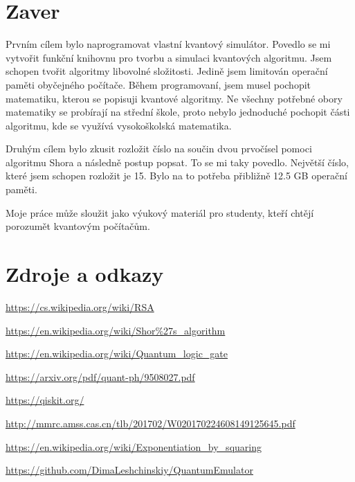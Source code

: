 \documentclass[11pt]{article}
\begin{document}
\newpage

\section{Zaver}
Prvním cílem bylo naprogramovat vlastní kvantový simulátor. Povedlo se mi vytvořit funkční knihovnu pro tvorbu a simulaci kvantových algoritmu.
Jsem schopen tvořit algoritmy libovolné složitosti.
Jedině jsem limitován operační paměti obyčejného počítače.
Během programovaní, jsem musel pochopit matematiku, kterou se popisuji kvantové algoritmy.
Ne všechny potřebné obory matematiky se probírají na střední škole,
proto nebylo jednoduché pochopit části algoritmu, kde se využívá vysokoškolská matematika.
\par Druhým cílem bylo zkusit rozložit číslo na součin dvou prvočísel pomoci algoritmu Shora a následně postup popsat.
To se mi taky povedlo.
Největší číslo, které jsem schopen rozložit je 15.
Bylo na to potřeba přibližně 12.5 GB operační paměti.
\par Moje práce může sloužit jako výukový materiál pro studenty, kteří chtějí porozumět kvantovým počítačům.
\newpage

\section{Zdroje a odkazy}
\color{blue}
\fontsize{10pt}{0}
\url{https://cs.wikipedia.org/wiki/RSA}
\par\url{https://en.wikipedia.org/wiki/Shor%27s_algorithm}
\par\url{https://en.wikipedia.org/wiki/Quantum_logic_gate}
\par\url{https://arxiv.org/pdf/quant-ph/9508027.pdf}
\par\url{https://qiskit.org/}
\par\url{http://mmrc.amss.cas.cn/tlb/201702/W020170224608149125645.pdf}
\par\url{https://en.wikipedia.org/wiki/Exponentiation_by_squaring}
\par\url{https://github.com/DimaLeshchinskiy/QuantumEmulator}
\end{document}
